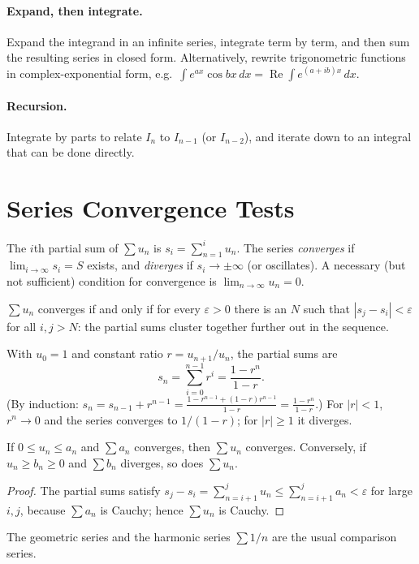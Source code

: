 \paragraph{Expand, then integrate.} Expand the integrand in an infinite series, integrate term by term, and then sum the resulting series in closed form. Alternatively, rewrite trigonometric functions in complex-exponential form, e.g.\ $\int e^{ax}\cos bx\,dx = \operatorname{Re}\int e^{(a+ib)x}\,dx$.

\paragraph{Recursion.} Integrate by parts to relate $I_n$ to $I_{n-1}$ (or $I_{n-2}$), and iterate down to an integral that can be done directly.

\section{Series Convergence Tests}

\begin{definition}
The $i$th partial sum of $\sum u_n$ is $s_i = \sum_{n=1}^i u_n$. The series \emph{converges} if $\lim_{i\to\infty} s_i = S$ exists, and \emph{diverges} if $s_i\to\pm\infty$ (or oscillates). A necessary (but not sufficient) condition for convergence is $\lim_{n\to\infty} u_n = 0$.
\end{definition}

\begin{theorem}
$\sum u_n$ converges if and only if for every $\varepsilon>0$ there is an $N$ such that $|s_j - s_i| < \varepsilon$ for all $i,j>N$: the partial sums cluster together further out in the sequence.
\end{theorem}

\begin{example}
With $u_0=1$ and constant ratio $r = u_{n+1}/u_n$, the partial sums are
\[
    s_n = \sum_{i=0}^{n-1} r^i = \frac{1-r^n}{1-r}.
\]
(By induction: $s_n = s_{n-1} + r^{n-1} = \frac{1-r^{n-1}+(1-r)r^{n-1}}{1-r} = \frac{1-r^n}{1-r}$.) For $|r|<1$, $r^n\to0$ and the series converges to $1/(1-r)$; for $|r|\ge1$ it diverges.
\end{example}

\begin{theorem}
If $0\le u_n\le a_n$ and $\sum a_n$ converges, then $\sum u_n$ converges. Conversely, if $u_n\ge b_n\ge0$ and $\sum b_n$ diverges, so does $\sum u_n$.
\end{theorem}
\begin{proof}
The partial sums satisfy $s_j - s_i = \sum_{n=i+1}^j u_n \le \sum_{n=i+1}^j a_n < \varepsilon$ for large $i,j$, because $\sum a_n$ is Cauchy; hence $\sum u_n$ is Cauchy.
\end{proof}
The geometric series and the harmonic series $\sum 1/n$ are the usual comparison series.

